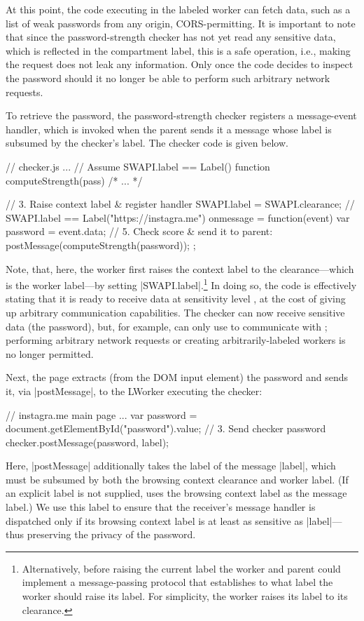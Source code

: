 At this point, the code executing in the labeled worker can fetch
data, such as a list of weak passwords from any origin,
CORS-permitting.
%
It is important to note that since the password-strength checker has
not yet read any sensitive data, which is reflected in the compartment
label, this is a safe operation, i.e., making the request does not
leak any information.
%
Only once the code decides to inspect the password should it no
longer be able to perform such arbitrary network requests.

To retrieve the password, the password-strength checker registers a
message-event handler, which is invoked when the parent sends it a
message whose label is subsumed by the checker's label.
%
The checker code is given below.
\begin{jscode}
// checker.js ...
// Assume SWAPI.label == Label()
function computeStrength(pass) { /* ... */ }

// 3. Raise context label & register handler
SWAPI.label = SWAPI.clearance;
// SWAPI.label == Label("https://instagra.me")
onmessage = function(event) {
  var password = event.data;
  // 5. Check score & send it to parent:
  postMessage(computeStrength(password));
};
\end{jscode}
%
Note, that, here, the worker first raises the context label to the
clearance---which is the worker label---by setting
\js|SWAPI.label|.\footnote{
  Alternatively, before raising the current label the worker and
  parent could implement a message-passing protocol that establishes
  to what label the worker should raise its label. For simplicity, the
  worker raises its label to its clearance.
}
%
In doing so, the code is effectively stating that it is ready to
receive data at sensitivity level , at the cost of
giving up arbitrary communication capabilities.
%
The checker can now receive sensitive data (the password), but, for
example, can only use \xhr{} to communicate with ;
%
performing arbitrary network requests or creating arbitrarily-labeled
workers is no longer permitted.

Next, the page extracts (from the DOM input element) the password and
sends it, via \js|postMessage|, to the LWorker executing the checker:
\begin{jscode}
// instagra.me main page ...
var password = 
 document.getElementById("password").value;
// 3. Send checker password 
checker.postMessage(password, label);
\end{jscode}
Here, \js|postMessage| additionally takes the label of the message
\js|label|, which must be subsumed by both the browsing context
clearance and worker label.
%
(If an explicit label is not supplied, \sys{} uses the browsing
context label as the message label.)
%
We use this label to ensure that the receiver's message handler is
dispatched only if its browsing context label is at least as sensitive
as \js|label|---thus preserving the privacy of the password.

